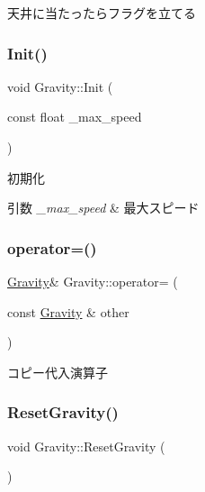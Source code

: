 天井に当たったらフラグを立てる 

\mbox{\label{class_gravity_acd4190d806a404342bbb49031e47b7b6}} 
\subsubsection{\texorpdfstring{Init()}{Init()}}
{\footnotesize\ttfamily void Gravity\+::\+Init (\begin{DoxyParamCaption}\item[{const float}]{\+\_\+max\+\_\+speed }\end{DoxyParamCaption})\hspace{0.3cm}{\ttfamily [inline]}}



初期化 


\begin{DoxyParams}{引数}
{\em \+\_\+max\+\_\+speed} & 最大スピード \\
\hline
\end{DoxyParams}
\mbox{\label{class_gravity_a68162c6452cad9eef17c6688266023c0}} 
\subsubsection{\texorpdfstring{operator=()}{operator=()}}
{\footnotesize\ttfamily \mbox{\hyperlink{class_gravity}{Gravity}}\& Gravity\+::operator= (\begin{DoxyParamCaption}\item[{const \mbox{\hyperlink{class_gravity}{Gravity}} \&}]{other }\end{DoxyParamCaption})\hspace{0.3cm}{\ttfamily [inline]}}



コピー代入演算子 

\mbox{\label{class_gravity_aa334a7ebbbd79ca28e7d29c3fc5c03ed}} 
\subsubsection{\texorpdfstring{Reset\+Gravity()}{ResetGravity()}}
{\footnotesize\ttfamily void Gravity\+::\+Reset\+Gravity (\begin{DoxyParamCaption}{ }\end{DoxyParamCaption})\hspace{0.3cm}{\ttfamily [inline]}}


